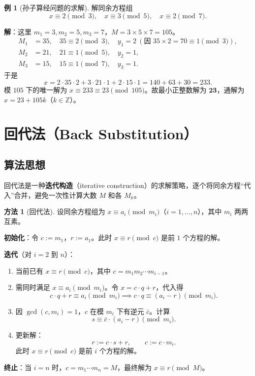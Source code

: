 \documentclass[UTF8,11pt,a4paper]{ctexbook}   %
\theoremstyle{definition}
\newtheorem{example}{例}[section]
\newtheorem{method}{方法}[section]
\begin{document}
\begin{example}[孙子算经问题的求解]
解同余方程组
\[
x \equiv 2 \pmod{3},\quad x \equiv 3 \pmod{5},\quad x \equiv 2 \pmod{7}.
\]

\textbf{解}：这里 $m_1=3, m_2=5, m_3=7$，$M = 3 \times 5 \times 7 = 105$。
\begin{align*}
M_1 &= 35,\quad 35 \equiv 2 \pmod{3},\quad y_1 = 2\ (\text{因 }35 \times 2 = 70 \equiv 1 \pmod{3}),\\
M_2 &= 21,\quad 21 \equiv 1 \pmod{5},\quad y_2 = 1,\\
M_3 &= 15,\quad 15 \equiv 1 \pmod{7},\quad y_3 = 1.
\end{align*}
于是
\[
x = 2 \cdot 35 \cdot 2 + 3 \cdot 21 \cdot 1 + 2 \cdot 15 \cdot 1 = 140 + 63 + 30 = 233.
\]
模 $105$ 下的唯一解为 $x \equiv 233 \equiv 23 \pmod{105}$。故最小正整数解为 $\mathbf{23}$，通解为 $x = 23 + 105k$（$k \in \mathbb{Z}$）。
\end{example}

\section{回代法（Back Substitution）}

\subsection{算法思想}

回代法是一种\textbf{迭代构造}（iterative construction）的求解策略，逐个将同余方程``代入''合并，避免一次性计算大数 $M$ 和各 $M_k$。

\begin{method}[回代法]
设同余方程组为 $x \equiv a_i \pmod{m_i}$（$i=1,\ldots,n$），其中 $m_i$ 两两互素。

\textbf{初始化}：令 $c := m_1$，$r := a_1$。此时 $x \equiv r \pmod{c}$ 是前 $1$ 个方程的解。

\textbf{迭代}（对 $i = 2$ 到 $n$）：
\begin{enumerate}
    \item 当前已有 $x \equiv r \pmod{c}$，其中 $c = m_1 m_2 \cdots m_{i-1}$。
    \item 需同时满足 $x \equiv a_i \pmod{m_i}$。令 $x = c \cdot q + r$，代入得
    \[
    c \cdot q + r \equiv a_i \pmod{m_i} \implies c \cdot q \equiv (a_i - r) \pmod{m_i}.
    \]
    \item 因 $\gcd(c, m_i)=1$，$c$ 在模 $m_i$ 下有逆元 $\bar{c}$。计算
    \[
    s \equiv \bar{c} \cdot (a_i - r) \pmod{m_i}.
    \]
    \item 更新解：
    \[
    r := c \cdot s + r,\qquad c := c \cdot m_i.
    \]
    此时 $x \equiv r \pmod{c}$ 是前 $i$ 个方程的解。
\end{enumerate}

\textbf{终止}：当 $i=n$ 时，$c = m_1 \cdots m_n = M$，最终解为 $x \equiv r \pmod{M}$。
\end{method}
\end{document}
